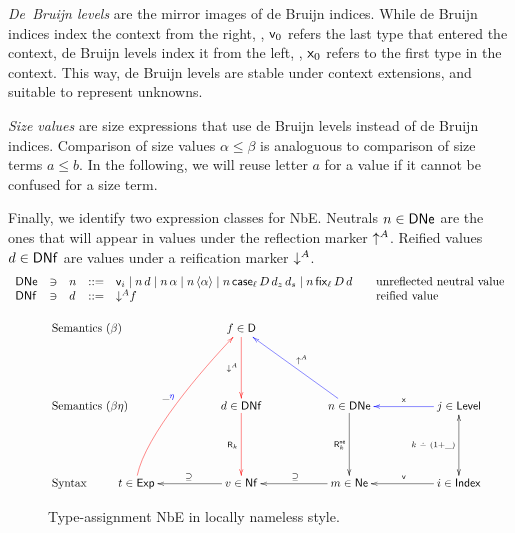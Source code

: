 \documentclass[acmlarge,review,anonymous]{acmart}\settopmatter{printfolios=true}
\begin{document}
\emph{De~Bruijn levels} are the mirror images of de Bruijn indices.  While de Bruijn
indices index the context from the right, \ie, $\mathsf{v}_{0}$ refers the
last type that entered the context, de Bruijn levels index it from the
left, \ie, $\mathsf{x}_{0}$ refers to the first type in the context.  This
way, de Bruijn levels are stable under context extensions, and
suitable to represent unknowns.

\emph{Size values} \fbox{$\alpha, \beta \in \SIZE$} are size
expressions that use de Bruijn levels instead of de Bruijn
indices. Comparison of size values $\alpha \leq \beta$ is
analoguous to comparison of size terms $a \leq b$.  In the following, we
will reuse letter $a$ for a value if it cannot be confused for a size
term.

Finally, we identify two expression classes for NbE. Neutrals
$n \in \mathsf{DNe}$ are the ones that will appear in values under the
reflection marker $\mathord{\uparrow^{A}}$.  Reified values $d \in \mathsf{DNf}$ are values
under a reification marker $\mathord{\downarrow^{A}}$.
\[
\begin{array}{lllll@{\qquad}l}
  \DNe & \ni &
  n & ::= & \ind i \mid n\,d \mid n\,\alpha \mid n\,\ann \alpha \mid
            n\,\case[\ell] D{d_z}{d_s} \mid n\,\fix[\ell] D d
    & \mbox{unreflected neutral value} \\
  \DNf & \ni &
  d & ::= & \down A f
    & \mbox{reified value} \\
\end{array}
\]

\begin{figure}
$$
\xymatrix@R=12ex@C=12ex{
\mathrlap{\mbox{Semantics ($\beta$)}} &
  &                f \in \D   \ar@[red][d]_{\down A}
\\
\mathrlap{\mbox{Semantics ($\beta\eta$)}} &
  &                d \in \DNf \ar@[red][d]_{\tR_k{}}
  &                n \in \DNe \ar[d]_{\tRne_k} \ar@[blue][ul]_{\up A}
  & \ar@[blue][l]_{\var{}} j \in \Level \ar@{<->}[d]_{k\dotminus(1+\_)}
\\
\mathrlap{\mbox{Syntax}} &
t \in \Exp \ar@[red]@(u,dl)[uur]^{\_\color{blue}\eta} %
  & \ar[l]_{\supseteq}  v \in \Nf
  & \ar[l]_{\supseteq}  m \in \Ne
  & \ar[l]_{\ind{}}     i \in \Index
  &
}
$$
\caption{Type-assignment NbE in locally nameless
    style.\label{fig:typedchart}}
\end{figure}
\end{document}

